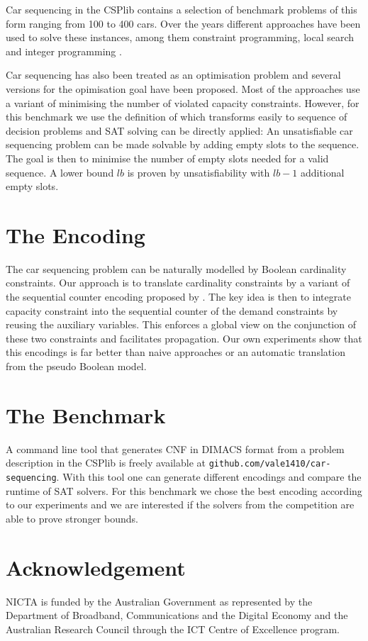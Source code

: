 \documentclass[conference]{IEEEtran}
\begin{document}
Car sequencing in the CSPlib contains a selection of benchmark problems of this form ranging from 100 to 400 cars. Over
the years different approaches have been used to solve these instances, among them constraint programming, local search
and integer programming \cite{Regin97}\cite{Gottlieb03}\cite{Gravel05}\cite{Estellon06}\cite{Siala12}.

Car sequencing has also been treated as an optimisation problem and several versions for the opimisation goal have been
proposed. Most of the approaches use a variant of minimising the number of violated capacity constraints.  However, for
this benchmark we use the definition of \cite{Perron04} which transforms easily to sequence of decision problems and SAT
solving can be directly applied: An unsatisfiable car sequencing problem can be made solvable by adding empty slots to
the sequence. The goal is then to minimise the number of empty slots needed for a valid sequence. A lower bound $lb$ is
proven by unsatisfiability with $lb-1$ additional empty slots. 

\section{The Encoding}

The car sequencing problem can be naturally modelled by Boolean cardinality constraints. Our approach is to  translate
cardinality constraints by a variant of the sequential counter encoding proposed by \cite{Sinz05}. The key idea is then
to integrate capacity constraint into the sequential counter of the demand constraints by reusing the auxiliary
variables. This enforces a global view on the conjunction of these two constraints and facilitates propagation. Our own
experiments show that this encodings is far better than naive approaches or an automatic translation from the pseudo
Boolean model. 

\section{The Benchmark}

A command line tool that generates CNF in DIMACS format from a problem description in the CSPlib is freely available at
\verb+github.com/vale1410/car-sequencing+. With this tool one can generate different encodings and compare the runtime
of SAT solvers. For this benchmark we chose the best encoding according to our experiments and we are interested if the
solvers from the competition are able to prove stronger bounds. 

\section*{Acknowledgement}

NICTA is funded by the Australian Government as represented by the Department of Broadband, Communications and the
Digital Economy and the Australian Research Council through the ICT Centre of Excellence program.




\end{document}

